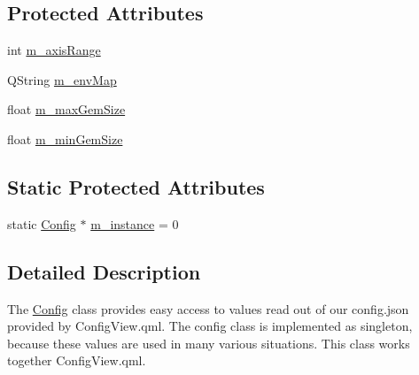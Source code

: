 \subsection*{Protected Attributes}
\begin{DoxyCompactItemize}
\item 
int \hyperlink{class_config_a5f172b706977841fdcb91351eeae817e}{m\+\_\+axis\+Range}
\item 
Q\+String \hyperlink{class_config_a70804accd579749b776f9c0c3e5c000b}{m\+\_\+env\+Map}
\item 
float \hyperlink{class_config_ae8a0c3906a4d18952a7fbb00868c963e}{m\+\_\+max\+Gem\+Size}
\item 
float \hyperlink{class_config_a7284f245054875419777e7cbad67183c}{m\+\_\+min\+Gem\+Size}
\end{DoxyCompactItemize}
\subsection*{Static Protected Attributes}
\begin{DoxyCompactItemize}
\item 
static \hyperlink{class_config}{Config} $\ast$ \hyperlink{class_config_af8e6282b4a10e5bce08419395394581b}{m\+\_\+instance} = 0
\end{DoxyCompactItemize}


\subsection{Detailed Description}
The \hyperlink{class_config}{Config} class provides easy access to values read out of our config.\+json provided by Config\+View.\+qml.  The config class is implemented as singleton, because these values are used in many various situations. This class works together Config\+View.\+qml. 

